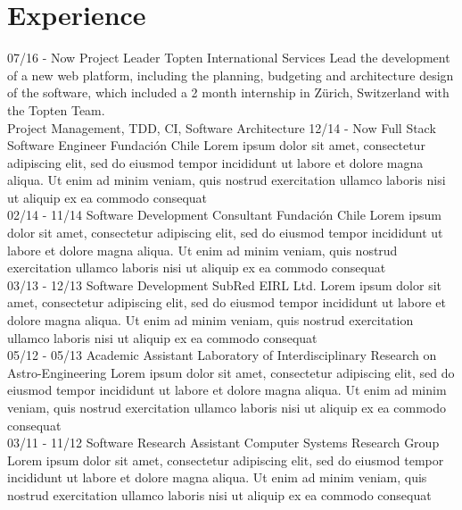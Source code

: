 \documentclass[]{friggeri-cv}
\begin{document}
\section{Experience}
\begin{entrylist}
  \entry
    {07/16 - Now}
    {Project Leader}
    {Topten International Services}
    {Lead the development of a new web platform, including the planning, budgeting and architecture design of the software, which included a 2 month internship in Zürich, Switzerland with the Topten Team.\\ Project Management, TDD, CI, Software Architecture}
  \entry
    {12/14 - Now}
    {Full Stack Software Engineer}
    {Fundación Chile}
    {Lorem ipsum dolor sit amet, consectetur adipiscing elit, sed do eiusmod tempor incididunt ut labore et dolore magna aliqua. Ut enim ad minim veniam, quis nostrud exercitation ullamco laboris nisi ut aliquip ex ea commodo consequat\\}
  \entry
    {02/14 - 11/14}
    {Software Development Consultant}
    {Fundación Chile}
    {Lorem ipsum dolor sit amet, consectetur adipiscing elit, sed do eiusmod tempor incididunt ut labore et dolore magna aliqua. Ut enim ad minim veniam, quis nostrud exercitation ullamco laboris nisi ut aliquip ex ea commodo consequat\\}
  \entry
    {03/13 - 12/13}
    {Software Development}
    {SubRed EIRL Ltd.}
    {Lorem ipsum dolor sit amet, consectetur adipiscing elit, sed do eiusmod tempor incididunt ut labore et dolore magna aliqua. Ut enim ad minim veniam, quis nostrud exercitation ullamco laboris nisi ut aliquip ex ea commodo consequat\\}
  \entry
    {05/12 - 05/13}
    {Academic Assistant}
    {Laboratory of Interdisciplinary Research on Astro-Engineering}
    {Lorem ipsum dolor sit amet, consectetur adipiscing elit, sed do eiusmod tempor incididunt ut labore et dolore magna aliqua. Ut enim ad minim veniam, quis nostrud exercitation ullamco laboris nisi ut aliquip ex ea commodo consequat\\}
  \entry
    {03/11 - 11/12}
    {Software Research Assistant}
    {Computer Systems Research Group}
    {Lorem ipsum dolor sit amet, consectetur adipiscing elit, sed do eiusmod tempor incididunt ut labore et dolore magna aliqua. Ut enim ad minim veniam, quis nostrud exercitation ullamco laboris nisi ut aliquip ex ea commodo consequat\\}
\end{entrylist}
\\
\end{document}
